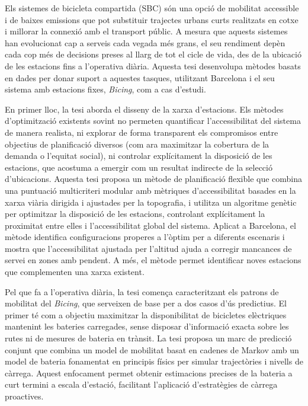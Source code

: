 \begin{catalanabstract}

Els sistemes de bicicleta compartida (SBC) són una opció de mobilitat accessible i de baixes emissions que pot substituir trajectes urbans curts realitzats en cotxe i millorar la connexió amb el transport públic. A mesura que aquests sistemes han evolucionat cap a serveis cada vegada més grans, el seu rendiment depèn cada cop més de decisions preses al llarg de tot el cicle de vida, des de la ubicació de les estacions fins a l'operativa diària. Aquesta tesi desenvolupa mètodes basats en dades per donar suport a aquestes tasques, utilitzant Barcelona i el seu sistema amb estacions fixes, \textit{Bicing}, com a cas d'estudi.

En primer lloc, la tesi aborda el disseny de la xarxa d'estacions. Els mètodes d'optimització existents sovint no permeten quantificar l'accessibilitat del sistema de manera realista, ni explorar de forma transparent els compromisos entre objectius de planificació diversos (com ara maximitzar la cobertura de la demanda o l'equitat social), ni controlar explícitament la disposició de les estacions, que acostuma a emergir com un resultat indirecte de la selecció d'ubicacions. Aquesta tesi proposa un mètode de planificació flexible que combina una puntuació multicriteri modular amb mètriques d'accessibilitat basades en la xarxa viària dirigida i ajustades per la topografia, i utilitza un algoritme genètic per optimitzar la disposició de les estacions, controlant explícitament la proximitat entre elles i l'accessibilitat global del sistema. Aplicat a Barcelona, el mètode identifica configuracions properes a l'òptim per a diferents escenaris i mostra que l'accessibilitat ajustada per l'altitud ajuda a corregir mancances de servei en zones amb pendent. A més, el mètode permet identificar noves estacions que complementen una xarxa existent.

Pel que fa a l'operativa diària, la tesi comença caracteritzant els patrons de mobilitat del \textit{Bicing}, que serveixen de base per a dos casos d'ús predictius. El primer té com a objectiu maximitzar la disponibilitat de bicicletes elèctriques mantenint les bateries carregades, sense disposar d'informació exacta sobre les rutes ni de mesures de bateria en trànsit. La tesi proposa un marc de predicció conjunt que combina un model de mobilitat basat en cadenes de Markov amb un model de bateria fonamentat en principis físics per simular trajectòries i nivells de càrrega. Aquest enfocament permet obtenir estimacions precises de la bateria a curt termini a escala d'estació, facilitant l'aplicació d'estratègies de càrrega proactives.


\end{catalanabstract}

